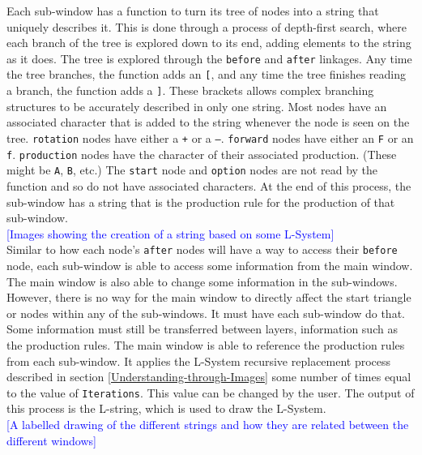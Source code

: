 \documentclass[12pt,twoside]{reedthesis}
\newcommand{\code}[1]{\texttt{#1}}
\begin{document}
	 Each sub-window has a function to turn its tree of nodes into a string that uniquely describes it. This is done through a process of depth-first search, where each branch of the tree is explored down to its end, adding elements to the string as it does. The tree is explored through the \code{before} and \code{after} linkages. Any time the tree branches, the function adds an \code{[}, and any time the tree finishes reading a branch, the function adds a \code{]}. These brackets allows complex branching structures to be accurately described in only one string. Most nodes have an associated character that is added to the string whenever the node is seen on the tree. \code{rotation} nodes have either a \code{+} or a \code{–}. \code{forward} nodes have either an \code{F} or an \code{f}. \code{production} nodes have the character of their associated production. (These might be \code{A}, \code{B}, etc.) The \code{start} node and \code{option} nodes are not read by the function and so do not have associated characters. At the end of this process, the sub-window has a string that is the production rule for the production of that sub-window.\\
	 
	 \textcolor{blue}{[Images showing the creation of a string based on some L-System]}\\
	
	Similar to how each node's \code{after} nodes will have a way to access their \code{before} node, each sub-window is able to access some information from the main window. The main window is also able to change some information in the sub-windows. However, there is no way for the main window to directly affect the start triangle or nodes within any of the sub-windows. It must have each sub-window do that. Some information must still be transferred between layers, information such as the production rules. The main window is able to reference the production rules from each sub-window. It applies the L-System recursive replacement process described in section \ref{Understanding-through-Images} some number of times equal to the value of \code{Iterations}. This value can be changed by the user. The output of this process is the L-string, which is used to draw the L-System.\\
	
	\textcolor{blue}{[A labelled drawing of the different strings and how they are related between the different windows]}\\
	
\end{document}
